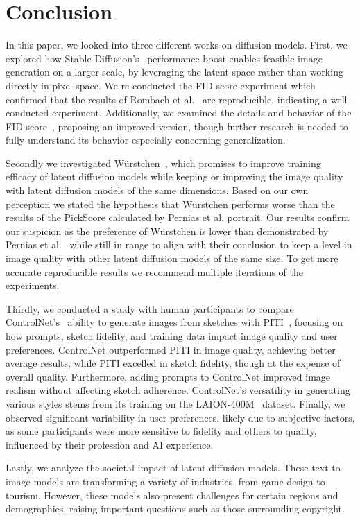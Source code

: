 \section{Conclusion}
In this paper, we looked into three different works on diffusion models. First,
we explored how Stable Diffusion's~\cite{rombach2022stablediffusion}
performance boost enables feasible image generation on a larger scale, by
leveraging the latent space rather than working directly in pixel space. We
re-conducted the FID score experiment which confirmed that the results of
Rombach et al.~\cite{rombach2022stablediffusion} are reproducible, indicating a
well-conducted experiment. Additionally, we examined the details and behavior
of the FID score~\cite{heusel2018ganstrainedtimescaleupdate}, proposing an
improved version, though further research is needed to fully understand its
behavior especially concerning generalization.

Secondly we investigated W\"urstchen~\cite{pernias2024wrstchen}, which promises
to improve training efficacy of latent diffusion models while keeping or
improving the image quality with latent diffusion models of the same dimensions.
Based on our own perception we stated the hypothesis that W\"urstchen performs
worse than the results of the PickScore calculated by Pernias et al. portrait.
Our results confirm our suspicion as the preference of W\"urstchen is lower
than demonstrated by Pernias et al.~\cite{pernias2024wrstchen} while still in
range to align with their conclusion to keep a level in image quality with
other latent diffusion models of the same size. To get more accurate
reproducible results we recommend multiple iterations of the experiments.

Thirdly, we conducted a study with human participants to compare
ControlNet's~\cite{zhang2023addingconditionalcontroltexttoimage} ability to
generate images from sketches with
PITI~\cite{wang2022pretrainingneedimagetoimagetranslation}, focusing on how
prompts, sketch fidelity, and training data impact image quality and user
preferences. ControlNet outperformed PITI in image quality, achieving
better average results, while PITI excelled in sketch fidelity, though at the
expense of overall quality. Furthermore, adding prompts to ControlNet improved
image realism without affecting sketch adherence. ControlNet's versatility in
generating various styles stems from its training on the
LAION-400M~\cite{schuhmann2021laion400mopendatasetclipfiltered} dataset.
Finally, we observed significant variability in user preferences, likely due to
subjective factors, as some participants were more sensitive to fidelity and
others to quality, influenced by their profession and AI experience.

Lastly, we analyze the societal impact of latent diffusion models. These
text-to-image models are transforming a variety of industries, from game design
to tourism. However, these models also present challenges for certain regions
and demographics, raising important questions such as those surrounding
copyright.